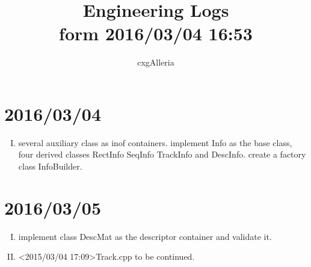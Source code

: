 \documentclass{ctexart}
\begin{document}
\title{%
	Engineering Logs\\ \small form 2016/03/04 16:53
}
\author{%
	cxgAlleria
}
\maketitle
\tableofcontents
	\section{2016/03/04}
		\begin{enumerate}[I.]
			\item several auxiliary class as inof containers. implement Info as the base class, four derived classes RectInfo SeqInfo TrackInfo and DescInfo. create a factory class InfoBuilder.
		\end{enumerate}
	\section{2016/03/05}
		\begin{enumerate}[I.]
			\item implement class DescMat as the descriptor container and validate it.
			\item <2015/03/04 17:09>Track.cpp to be continued.
		\end{enumerate}
\end{document}
